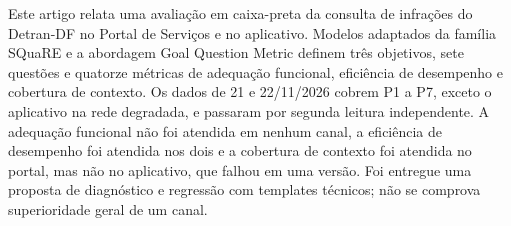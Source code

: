\begin{abstract}
This paper reports a black-box quality evaluation of Detran-DF's traffic infraction consultation through its Services Portal and mobile application. Adapted SQuaRE models and Goal Question Metric define three goals, seven questions and fourteen metrics for functional suitability, performance efficiency and context coverage. Data collected on November 21 and 22, 2026 cover procedures P1 to P7, except the application under degraded network, and were independently double-read. Functional suitability was not met by either channel, performance efficiency was met by both, and context coverage was met by the portal but not by the application, which failed in one version. A diagnostic and regression process with technical templates was delivered; no general channel superiority is established.
\end{abstract}

\begin{resumo}
Este artigo relata uma avaliação em caixa-preta da consulta de infrações do Detran-DF no Portal de Serviços e no aplicativo. Modelos adaptados da família SQuaRE e a abordagem Goal Question Metric definem três objetivos, sete questões e quatorze métricas de adequação funcional, eficiência de desempenho e cobertura de contexto. Os dados de 21 e 22/11/2026 cobrem P1 a P7, exceto o aplicativo na rede degradada, e passaram por segunda leitura independente. A adequação funcional não foi atendida em nenhum canal, a eficiência de desempenho foi atendida nos dois e a cobertura de contexto foi atendida no portal, mas não no aplicativo, que falhou em uma versão. Foi entregue uma proposta de diagnóstico e regressão com templates técnicos; não se comprova superioridade geral de um canal.
\end{resumo}
